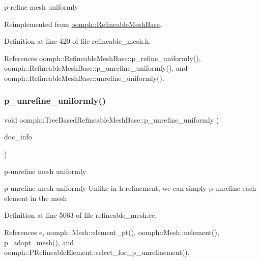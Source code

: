 p-\/refine mesh uniformly 



Reimplemented from \hyperlink{classoomph_1_1RefineableMeshBase_a648a6fd1b186baf1b01c07b879280480}{oomph\+::\+Refineable\+Mesh\+Base}.



Definition at line 420 of file refineable\+\_\+mesh.\+h.



References oomph\+::\+Refineable\+Mesh\+Base\+::p\+\_\+refine\+\_\+uniformly(), oomph\+::\+Refineable\+Mesh\+Base\+::p\+\_\+unrefine\+\_\+uniformly(), and oomph\+::\+Refineable\+Mesh\+Base\+::unrefine\+\_\+uniformly().

\mbox{\label{classoomph_1_1TreeBasedRefineableMeshBase_a937e4097d480ed921b86ec4a7e885df6}} 
\subsubsection{\texorpdfstring{p\+\_\+unrefine\+\_\+uniformly()}{p\_unrefine\_uniformly()}}
{\footnotesize\ttfamily void oomph\+::\+Tree\+Based\+Refineable\+Mesh\+Base\+::p\+\_\+unrefine\+\_\+uniformly (\begin{DoxyParamCaption}\item[{\hyperlink{classoomph_1_1DocInfo}{Doc\+Info} \&}]{doc\+\_\+info }\end{DoxyParamCaption})}



p-\/unrefine mesh uniformly 

p-\/unrefine mesh uniformly Unlike in h-\/refinement, we can simply p-\/unrefine each element in the mesh 

Definition at line 5063 of file refineable\+\_\+mesh.\+cc.



References e, oomph\+::\+Mesh\+::element\+\_\+pt(), oomph\+::\+Mesh\+::nelement(), p\+\_\+adapt\+\_\+mesh(), and oomph\+::\+P\+Refineable\+Element\+::select\+\_\+for\+\_\+p\+\_\+unrefinement().

\mbox{\label{classoomph_1_1TreeBasedRefineableMeshBase_a0c601c4e58e2d7dcfe587739f17e44e9}} 
